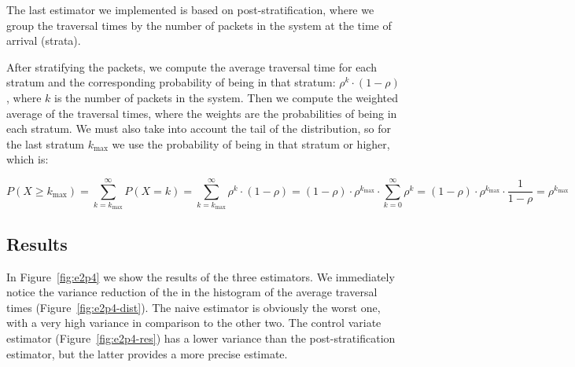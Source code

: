 \documentclass[a4paper]{article}
\begin{document}
The last estimator we implemented is based on post-stratification, where we group the traversal times by the number of packets in the system at the time of arrival (strata).

After stratifying the packets, we compute the average traversal time for each stratum and the corresponding probability of being in that stratum: $\rho^k \cdot (1 - \rho)$, where $k$ is the number of packets in the system.
Then we compute the weighted average of the traversal times, where the weights are the probabilities of being in each stratum. We must also take into account the tail of the distribution, so for the last stratum $k_{\text{max}}$ we use the probability of being in that stratum or higher, which is:

\begin{equation}
  P(X \geq k_{\text{max}}) = \sum_{k=k_{\text{max}}}^{\infty} P(X = k) = \sum_{k=k_{\text{max}}}^{\infty} \rho^k \cdot (1 - \rho) = (1 - \rho) \cdot \rho^{k_{\text{max}}} \cdot \sum_{k=0}^{\infty} \rho^k = (1 - \rho) \cdot \rho^{k_{\text{max}}} \cdot \frac{1}{1 - \rho} = \rho^{k_{\text{max}}}
\end{equation}

\subsection*{Results}

In Figure~\ref{fig:e2p4} we show the results of the three estimators. We immediately notice the variance reduction of the in the histogram of the average traversal times (Figure~\ref{fig:e2p4-dist}). 
The naive estimator is obviously the worst one, with a very high variance in comparison to the other two.
The control variate estimator (Figure~\ref{fig:e2p4-res}) has a lower variance than the post-stratification estimator, but the latter provides a more precise estimate.
\end{document}
